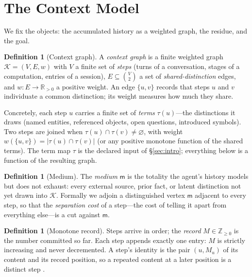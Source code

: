 \documentclass[11pt,twocolumn,a4paper]{article}
\theoremstyle{thmstyle}
\theoremstyle{definition}
\newtheorem{definition}[theorem]{Definition}
\theoremstyle{remark}
\newcommand{\R}{\mathbb{R}}
\newcommand{\Zp}{\mathbb{Z}_{\ge 0}}
\newcommand{\Ctx}{\mathcal{K}}          %
\newcommand{\Vrt}{V}
\newcommand{\Edg}{E}
\newcommand{\wt}{w}
\newcommand{\med}{\mathsf{m}}           %
\newcommand{\abs}[1]{\lvert#1\rvert}
\newcommand{\set}[1]{\{#1\}}
\begin{document}
\section{The Context Model}
\label{sec:model}

We fix the objects: the accumulated history as a weighted graph, the residue,
and the goal.

\begin{definition}[Context graph]
\label{def:ctx}
A \emph{context graph} is a finite weighted graph $\Ctx=(\Vrt,\Edg,\wt)$ with
$\Vrt$ a finite set of \emph{steps} (turns of a conversation, stages of a
computation, entries of a session), $\Edg\subseteq\binom{\Vrt}{2}$ a set of
\emph{shared-distinction} edges, and $\wt\colon\Edg\to\R_{>0}$ a positive weight.
An edge $\set{u,v}$ records that steps $u$ and $v$ individuate a common
distinction; its weight measures how much they share.
\end{definition}

Concretely, each step $u$ carries a finite set of \emph{terms} $\tau(u)$---the
distinctions it draws (named entities, referenced objects, open questions,
introduced symbols). Two steps are joined when $\tau(u)\cap\tau(v)\neq\varnothing$,
with weight $\wt(\set{u,v})=\abs{\tau(u)\cap\tau(v)}$ (or any positive monotone
function of the shared terms). The term map $\tau$ is the declared input of
\S\ref{sec:intro}; everything below is a function of the resulting graph.

\begin{definition}[Medium]
\label{def:medium}
The \emph{medium} $\med$ is the totality the agent's history models but does not
exhaust: every external source, prior fact, or latent distinction not yet drawn
into $\Ctx$. Formally we adjoin a distinguished vertex $\med$ adjacent to every
step, so that the \emph{separation cost} of a step---the cost of telling it apart
from everything else---is a cut against $\med$.
\end{definition}

\begin{definition}[Monotone record]
\label{def:record}
Steps arrive in order; the \emph{record} $M\in\Zp$ is the number committed so
far. Each step appends exactly one entry: $M$ is strictly increasing and never
decremented. A step's identity is the pair $(u,M_u)$ of its content and its
record position, so a repeated content at a later position is a distinct step
\citep{lamport1978}.
\end{definition}
\end{document}
